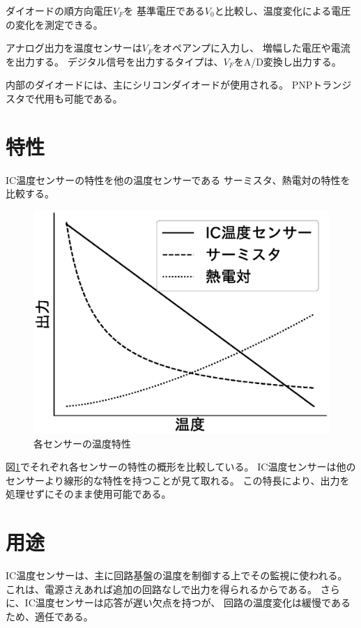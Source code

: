 \documentclass[twocolumn]{jsarticle}
\begin{document}
        ダイオードの順方向電圧$V_F$を
        基準電圧である$V_0$と比較し、温度変化による電圧の変化を測定できる。
        
        アナログ出力を温度センサーは$V_F$をオペアンプに入力し、
        増幅した電圧や電流を出力する。
        デジタル信号を出力するタイプは、$V_F$をA/D変換し出力する。


        内部のダイオードには、主にシリコンダイオードが使用される。
        PNPトランジスタで代用も可能である。

\section{特性}
    IC温度センサーの特性を他の温度センサーである
    サーミスタ、熱電対の特性を比較する。

    \begin{figure}[h]
        \centering
        \includegraphics[width=1\hsize]{img/sensors.eps}
        \caption{各センサーの温度特性}
        \label{fig:sensors}
    \end{figure}

    図\ref{fig:sensors}でそれぞれ各センサーの特性の概形を比較している。
    IC温度センサーは他のセンサーより線形的な特性を持つことが見て取れる。
    この特長により、出力を処理せずにそのまま使用可能である。

\section{用途}
    IC温度センサーは、主に回路基盤の温度を制御する上でその監視に使われる。
    これは、電源さえあれば追加の回路なしで出力を得られるからである。
    さらに、IC温度センサーは応答が遅い欠点を持つが、
    回路の温度変化は緩慢であるため、適任である。
\end{document}
